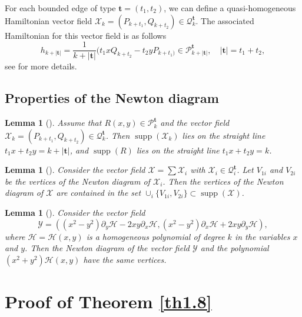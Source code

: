 \documentclass[10pt,a4paper]{amsart}
\numberwithin{equation}{section}
\newtheorem{lemma}[theo]{Lemma}
\begin{document}
For each bounded edge of type $\mathbf{t}=(t_1,t_2)$, we can define a quasi-homogeneous 
Hamiltonian vector field 
$\mathscr{X}_{k}=(P_{k+t_{1}},Q_{k+t_{2}})\in \mathcal{Q}_{k}^{\mathbf{t}}$. 
The associated Hamiltonian for this vector field is as follows
\begin{equation}\label{eq2-6}
h_{k+|\mathbf{t}|}=\frac{1}{k+|\mathbf{t}|}(t_{1}xQ_{k+t_2}-t_{2}yP_{k+t_1)}
\in \mathcal{P}_{k+|\mathbf{t}|}^{\mathbf{t}}, \quad |\mathbf{t}|=t_1+t_2,
\end{equation}
see \cite{bib 1} for more details.

\subsection{Properties of the Newton diagram}

\begin{lemma}[\cite{bib 25}] \label{lem2.1}
Assume that $R(x,y)\in \mathcal{P}_{k}^{\textbf{t}}$ and the vector 
field  $\mathscr{X}_{k}=(P_{k+t_{1}},Q_{k+t_{2}})\in \mathcal{Q}_{k}^{\textbf{t}}$. 
Then $\operatorname{supp}(\mathscr{X}_{k})$ lies on the straight line 
$t_1x+t_2y=k+|\textbf{t}|$, and $\operatorname{supp}(R)$ lies on the straight line
$t_1x+t_2y=k$.
\end{lemma}

\begin{lemma}[\cite{bib 25}] \label{lem2.2}
Consider the vector field $\mathscr{X}=\sum \mathscr{X}_{i}$ with 
$\mathscr{X}_{i}\in \mathcal{Q}_{i}^{\textbf{t}}$. Let $V_{1i}$ and $V_{2i}$ be the 
vertices of the Newton diagram of $\mathscr{X}_{i}$. Then the vertices of the Newton 
diagram of $\mathscr{X}$ are contained in
the set $\cup_{i}\{V_{1i},V_{2i}\}\subset \operatorname{supp}(\mathscr{X})$.
\end{lemma}

\begin{lemma}[\cite{bib 25}] \label{lem2.3}
 Consider the vector field
\[
\mathcal{Y}=((x^2-y^2)\partial_{y}\mathcal{H}-2xy\partial_{x}\mathcal{H}, 
(x^2-y^2)\partial_{x}\mathcal{H}+2xy\partial_{y}\mathcal{H}),
\]
where $\mathcal{H}=\mathcal{H}(x,y)$ is a homogeneous polynomial of degree $k$ in 
the variables $x$ and $y$. Then the Newton diagram of the vector field $\mathcal{Y}$ 
and the polynomial $(x^2+y^2)\mathcal{H}(x,y)$ have the same vertices.
\end{lemma}


\section{Proof of Theorem \ref{th1.8}}\label{sec3}
\end{document}

